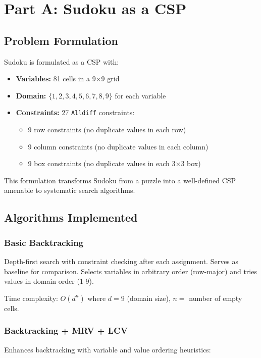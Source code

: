 \documentclass[letterpaper]{article}
\begin{document}
\section{Part A: Sudoku as a CSP}

\subsection{Problem Formulation}

Sudoku is formulated as a CSP with:
\begin{itemize}
\item \textbf{Variables:} 81 cells in a 9×9 grid
\item \textbf{Domain:} $\{1, 2, 3, 4, 5, 6, 7, 8, 9\}$ for each variable
\item \textbf{Constraints:} 27 \texttt{Alldiff} constraints:
  \begin{itemize}
  \item 9 row constraints (no duplicate values in each row)
  \item 9 column constraints (no duplicate values in each column)
  \item 9 box constraints (no duplicate values in each 3×3 box)
  \end{itemize}
\end{itemize}

This formulation transforms Sudoku from a puzzle into a well-defined CSP amenable to systematic search algorithms.

\subsection{Algorithms Implemented}

\subsubsection{Basic Backtracking}
Depth-first search with constraint checking after each assignment. Serves as baseline for comparison. Selects variables in arbitrary order (row-major) and tries values in domain order (1-9).

Time complexity: $O(d^n)$ where $d=9$ (domain size), $n=$ number of empty cells.

\subsubsection{Backtracking + MRV + LCV}
Enhances backtracking with variable and value ordering heuristics:
\end{document}
